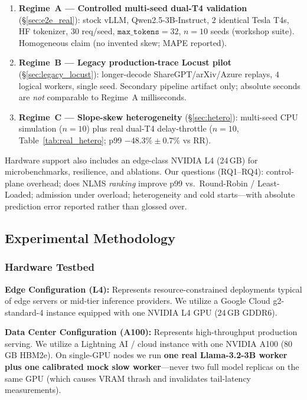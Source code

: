 \documentclass[10pt,twocolumn,letterpaper]{article}
\begin{document}
\begin{enumerate}
    \item \textbf{Regime~A --- Controlled multi-seed dual-T4 validation} (\S\ref{sec:e2e_real}): stock vLLM, Qwen2.5-3B-Instruct, $2$ identical Tesla T4s, HF tokenizer, $30$ req/seed, $\texttt{max\_tokens}{=}32$, $n{=}10$ seeds (workshop suite). Homogeneous claim (no invented skew; MAPE reported).
    \item \textbf{Regime~B --- Legacy production-trace Locust pilot} (\S\ref{sec:legacy_locust}): longer-decode ShareGPT/arXiv/Azure replays, $4$ logical workers, single seed. Secondary pipeline artifact only; absolute seconds are \emph{not} comparable to Regime~A milliseconds.
    \item \textbf{Regime~C --- Slope-skew heterogeneity} (\S\ref{sec:hetero}): multi-seed CPU simulation ($n{=}10$) plus real dual-T4 delay-throttle ($n{=}10$, Table~\ref{tab:real_hetero}; p99 $-48.3\%\pm0.7\%$ vs RR).
\end{enumerate}

Hardware support also includes an edge-class NVIDIA L4 (24\,GB) for microbenchmarks, resilience, and ablations. Our questions (RQ1--RQ4): control-plane overhead; does NLMS \emph{ranking} improve p99 vs.\ Round-Robin / Least-Loaded; admission under overload; heterogeneity and cold starts---with absolute prediction error reported rather than glossed over.

\subsection{Experimental Methodology}

\subsubsection{Hardware Testbed}
\textbf{Edge Configuration (L4):} Represents resource-constrained deployments typical of edge servers or mid-tier inference providers. We utilize a Google Cloud g2-standard-4 instance equipped with one NVIDIA L4 GPU (24\,GB GDDR6).

\textbf{Data Center Configuration (A100):} Represents high-throughput production serving. We utilize a Lightning AI / cloud instance with one NVIDIA A100 (80\,GB HBM2e). On single-GPU nodes we run \textbf{one real Llama-3.2-3B worker plus one calibrated mock slow worker}---never two full model replicas on the same GPU (which causes VRAM thrash and invalidates tail-latency measurements).
\end{document}
